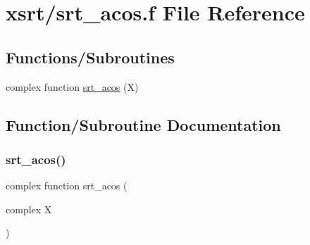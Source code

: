 \hypertarget{xsrt_2srt__acos_8f}{}\section{xsrt/srt\+\_\+acos.f File Reference}
\label{xsrt_2srt__acos_8f}
\subsection*{Functions/\+Subroutines}
\begin{DoxyCompactItemize}
\item 
complex function \hyperlink{xsrt_2srt__acos_8f_ab47c705e50e0b0220fb2d72a876859df}{srt\+\_\+acos} (X)
\end{DoxyCompactItemize}


\subsection{Function/\+Subroutine Documentation}
\mbox{\label{xsrt_2srt__acos_8f_ab47c705e50e0b0220fb2d72a876859df}} 
\subsubsection{\texorpdfstring{srt\+\_\+acos()}{srt\_acos()}}
{\footnotesize\ttfamily complex function srt\+\_\+acos (\begin{DoxyParamCaption}\item[{complex}]{X }\end{DoxyParamCaption})}


